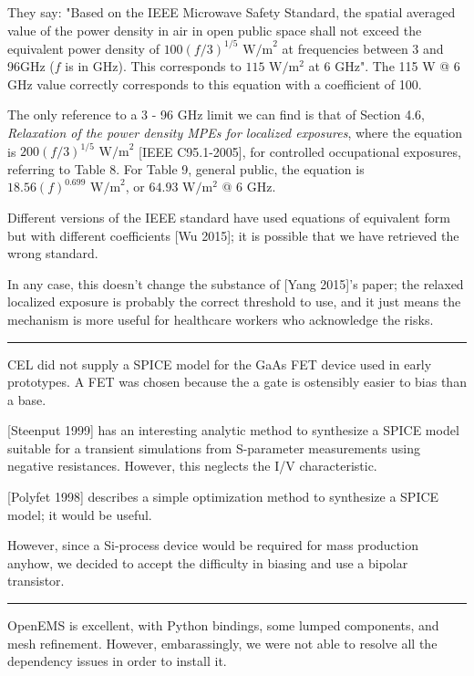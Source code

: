 \documentclass[fleqn,10pt]{article}
\begin{document}
\begin{multicols}{1}
They say: "Based on the IEEE Microwave Safety Standard, the spatial averaged value of the power density in air in open public space shall not exceed the equivalent power density of $100(f/3)^{1/5} \text{ W/m}^2$ at frequencies between 3 and 96GHz ($f$ is in GHz). This corresponds to $115 \text{ W}/\text{m}^2$ at 6 GHz". The 115 W @ 6 GHz value correctly corresponds to this equation with a coefficient of 100.

The only reference to a 3 - 96 GHz limit we can find is that of Section 4.6, {\it Relaxation of the power density MPEs for localized exposures}, where the equation is $200 (f/3)^{1/5} \text{ W/m}^2$ [IEEE C95.1-2005], for controlled occupational exposures, referring to Table 8. For Table 9, general public, the equation is $18.56 (f)^{0.699} \text{ W/m}^2$, or $64.93 \text{ W}/\text{m}^2$ @ 6 GHz. 

Different versions of the IEEE standard have used equations of equivalent form but with different coefficients [Wu 2015]; it is possible that we have retrieved the wrong standard.

In any case, this doesn't change the substance of [Yang 2015]'s paper; the relaxed localized exposure is probably the correct threshold to use, and it just means the mechanism is more useful for healthcare workers who acknowledge the risks.

\rule{\linewidth}{0.2pt}



CEL did not supply a SPICE model for the GaAs FET device used in early prototypes. A FET was chosen because the a gate is ostensibly easier to bias than a base.

[Steenput 1999] has an interesting analytic method to synthesize a SPICE model suitable for a transient simulations from S-parameter measurements using negative resistances. However, this neglects the I/V characteristic. 

[Polyfet 1998] describes a simple optimization method to synthesize a SPICE model; it would be useful.

However, since a Si-process device would be required for mass production anyhow, we decided to accept the difficulty in biasing and use a bipolar transistor.

\rule{\linewidth}{0.2pt}

OpenEMS is excellent, with Python bindings, some lumped components, and mesh refinement. However, embarassingly, we were not able to resolve all the dependency issues in order to install it.


\end{multicols}
\end{document}
